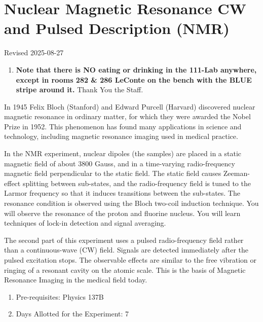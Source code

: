 \documentclass{../lab}
\begin{document}
\maketitle

\tableofcontents

\section{Nuclear Magnetic Resonance CW and Pulsed Description (NMR)}

Revised 2025-08-27

\begin{enumerate}
    \item \textbf{Note that there is NO eating or drinking in the 111-Lab anywhere, except in rooms 282 \& 286 LeConte on the bench with the BLUE stripe around it.} Thank You the Staff.
\end{enumerate}

In 1945 Felix Bloch (Stanford) and Edward Purcell (Harvard) discovered nuclear magnetic resonance in ordinary matter, for which they were awarded the Nobel Prize in 1952. This phenomenon has found many applications in science and technology, including magnetic resonance imaging used in medical practice.

In the NMR experiment, nuclear dipoles (the samples) are placed in a static magnetic field of about 3800 Gauss, and in a time-varying radio-frequency magnetic field perpendicular to the static field. The static field causes Zeeman-effect splitting between sub-states, and the radio-frequency field is tuned to the Larmor frequency so that it induces transitions between the sub-states. The resonance condition is observed using the Bloch two-coil induction technique. You will observe the resonance of the proton and fluorine nucleus. You will learn techniques of lock-in detection and signal averaging.

The second part of this experiment uses a pulsed radio-frequency field rather than a continuous-wave (CW) field. Signals are detected immediately after the pulsed excitation stops. The observable effects are similar to the free vibration or ringing of a resonant cavity on the atomic scale. This is the basis of Magnetic Resonance Imaging in the medical field today.

\begin{enumerate}
    \item Pre-requisites: Physics 137B

    \item Days Allotted for the Experiment: 7

\end{enumerate}
\end{document}
